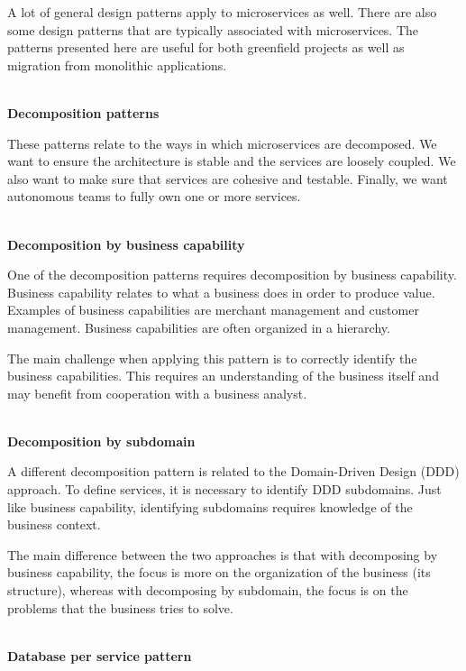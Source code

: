 A lot of general design patterns apply to microservices as well. There are also some design patterns that are typically associated with microservices. The patterns presented here are useful for both greenfield projects as well as migration from monolithic applications.

\hspace*{\fill} \\ %
\noindent
\textbf{Decomposition patterns}

These patterns relate to the ways in which microservices are decomposed. We want to ensure the architecture is stable and the services are loosely coupled. We also want to make sure that services are cohesive and testable. Finally, we want autonomous teams to fully own one or more services.

\hspace*{\fill} \\ %
\noindent
\textbf{Decomposition by business capability}

One of the decomposition patterns requires decomposition by business capability. Business capability relates to what a business does in order to produce value. Examples of business capabilities are merchant management and customer management. Business capabilities are often organized in a hierarchy.

The main challenge when applying this pattern is to correctly identify the business capabilities. This requires an understanding of the business itself and may benefit from cooperation with a business analyst.

\hspace*{\fill} \\ %
\noindent
\textbf{Decomposition by subdomain}

A different decomposition pattern is related to the Domain-Driven Design (DDD) approach. To define services, it is necessary to identify DDD subdomains. Just like business capability, identifying subdomains requires knowledge of the business context.

The main difference between the two approaches is that with decomposing by business capability, the focus is more on the organization of the business (its structure), whereas with decomposing by subdomain, the focus is on the problems that the business tries to solve.

\hspace*{\fill} \\ %
\noindent
\textbf{Database per service pattern}

